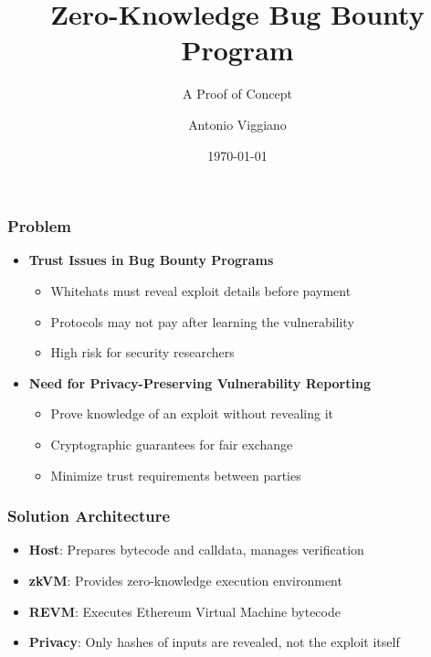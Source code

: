 \documentclass{beamer}
\title{Zero-Knowledge Bug Bounty Program}
\subtitle{A Proof of Concept}
\author{Antonio Viggiano}
\date{\today}
\begin{document}
\frame{\titlepage}

\begin{frame}
\frametitle{Problem}
\begin{itemize}
    \item \textbf{Trust Issues in Bug Bounty Programs}
        \begin{itemize}
            \item Whitehats must reveal exploit details before payment
            \item Protocols may not pay after learning the vulnerability
            \item High risk for security researchers
        \end{itemize}
    \item \textbf{Need for Privacy-Preserving Vulnerability Reporting}
        \begin{itemize}
            \item Prove knowledge of an exploit without revealing it
            \item Cryptographic guarantees for fair exchange
            \item Minimize trust requirements between parties
        \end{itemize}
\end{itemize}
\end{frame}

\begin{frame}
\frametitle{Solution Architecture}
\begin{center}
\end{center}

\begin{itemize}
    \item \textbf{Host}: Prepares bytecode and calldata, manages verification
    \item \textbf{zkVM}: Provides zero-knowledge execution environment
    \item \textbf{REVM}: Executes Ethereum Virtual Machine bytecode
    \item \textbf{Privacy}: Only hashes of inputs are revealed, not the exploit itself
\end{itemize}
\end{frame}
\end{document}
